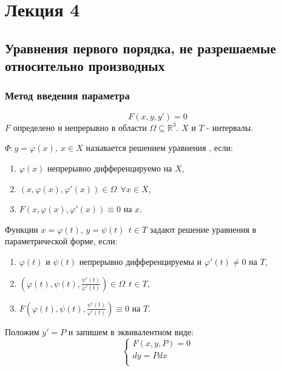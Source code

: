 \section{Лекция 4}
  \subsection{Уравнения первого порядка, не разрешаемые относительно производных}
  \subsubsection{Метод введения параметра}
  \begin{equation}
  \label{four.one}
  F(x, y, y') = 0
  \end{equation}
  $F$ определено и непрерывно в области $ \Omega \subseteq \mathbb{R}^3$. $X$ и $T$ - интервалы.
  \begin{df}
  $\varPhi: y = \varphi(x),~ x \in X$ называется решением уравнения , если:
  \begin{enumerate}
  \item $\varphi(x)$ непрерывно дифференцируемо на $X$,
  \item $(x, \varphi(x), \varphi'(x)) \in \Omega ~~ \forall x \in X$,
  \item $F(x, \varphi(x), \varphi'(x)) \equiv 0$ на $x$.
  \end{enumerate}
  \end{df}

  \begin{df}
  Функции $x = \varphi(t)$, $y = \psi(t)~~ t \in T$ задают решение уравнения  в параметрической форме, если:
  \begin{enumerate}
  \item $\varphi(t)$ и $\psi(t)$ непрерывно дифференцируемы и $\varphi'(t) \neq 0$ на $T$,
  \item $\left(\varphi(t), \psi(t), \frac{\psi'(t)}{\varphi'(t)}\right) \in \Omega ~~ t \in T$,
  \item $F\left(\varphi(t), \psi(t), \frac{\psi'(t)}{\varphi'(t)}\right) \equiv 0$ на $T$.
  \end{enumerate}
  \end{df}

  Положим $y' = P$ и запишем  в эквивалентном виде:
  \begin{equation}
  \begin{cases}
  \label{four.two}
  F(x ,y, P) = 0 \\
  dy = Pdx \\
  \end{cases}
  \end{equation}

